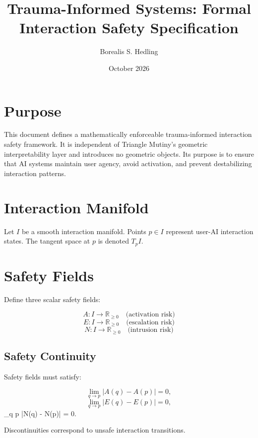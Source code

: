 \documentclass[11pt]{article}
\title{Trauma-Informed Systems: Formal Interaction Safety Specification}
\author{Borealis S. Hedling}
\date{October 2026}
\begin{document}
\maketitle

\section{Purpose}

This document defines a mathematically enforceable trauma-informed interaction
safety framework. It is independent of Triangle Mutiny’s geometric
interpretability layer and introduces no geometric objects. Its purpose is to
ensure that AI systems maintain user agency, avoid activation, and prevent
destabilizing interaction patterns.

\section{Interaction Manifold}

Let $I$ be a smooth interaction manifold. Points $p \in I$ represent user-AI
interaction states. The tangent space at $p$ is denoted $T_pI$.

\section{Safety Fields}

Define three scalar safety fields:

\[
A : I \to \mathbb{R}_{\ge 0} \quad \text{(activation risk)}
\]
\[
E : I \to \mathbb{R}_{\ge 0} \quad \text{(escalation risk)}
\]
\[
N : I \to \mathbb{R}_{\ge 0} \quad \text{(intrusion risk)}
\]

\subsection{Safety Continuity}

Safety fields must satisfy:

\[
\lim_{q \to p} |A(q) - A(p)| = 0,
\]
\[
\lim_{q \to p} |E(q) - E(p)| = 0,
\]
\]
\lim_{q \to p} |N(q) - N(p)| = 0.
\]

Discontinuities correspond to unsafe interaction transitions.

\end{document}
